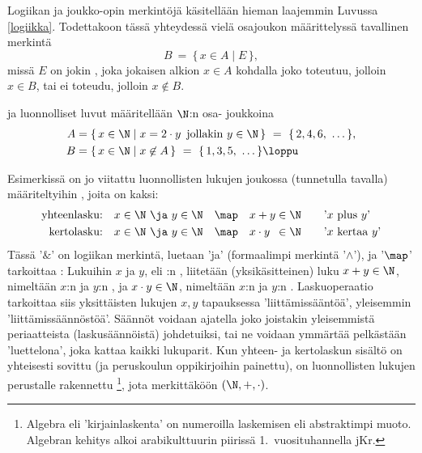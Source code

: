 Logiikan ja joukko-opin merkintöjä käsitellään hieman laajemmin Luvussa \ref{logiikka}. 
Todettakoon tässä yhteydessä vielä osajoukon määrittelyssä tavallinen merkintä
\[ 
B\ =\ \{\,x \in A \mid E\,\}, 
\]
missä $E$ on jokin , joka jokaisen alkion $x \in A$ kohdalla joko toteutuu, jolloin 
$x \in B$, tai ei toteudu, jolloin $x \not\in B$.
\begin{Exa}  ja  luonnolliset luvut määritellään $\N$:n osa-
joukkoina %
\begin{align*}
A &= \{\,x \in \N \mid x=2\cdot y\,\ \text{jollakin}\ y\in\N\,\}\ =\ \{\,2,4,6,\ \ldots\,\}, \\
B &= \{\,x\in\N \mid x\not\in A\,\}\ =\ \{\,1,3,5,\ \ldots\,\} \loppu
\end{align*} 
\end{Exa}
Esimerkissä on jo viitattu luonnollisten lukujen joukossa (tunnetulla tavalla) määriteltyihin 
%
, joita on kaksi:
\begin{align*}
\text{yhteenlasku:} \quad &x \in \N\ \ja\ y \in \N \quad \map \quad 
                             x + y \in \N \quad \quad \text{'$x$ plus $y$'} \\
\text{kertolasku:}  \quad &x \in \N\ \ja\ y \in \N \quad \map \quad 
                             x \cdot y\ \,\in \N \quad \quad \text{'$x$ kertaa $y$'}
\end{align*}
Tässä '$\&$' on logiikan merkintä, luetaan 'ja' (formaalimpi merkintä '$\wedge$'), ja 
'$\map$' tarkoittaa : Lukuihin $x$ ja $y$, eli \N:n , liitetään
(yksikäsitteinen) luku $x + y \in \N$, nimeltään $x$:n ja $y$:n , ja 
$x \cdot y \in \N$, nimeltään $x$:n ja $y$:n . Laskuoperaatio tarkoittaa siis 
yksittäisten lukujen $x,y$ tapauksessa 'liittämissääntöä', yleisemmin 'liittämissäännöstöä'. 
Säännöt voidaan ajatella joko joistakin yleisemmistä periaatteista (laskusäännöistä) 
johdetuiksi, tai ne voidaan ymmärtää pelkästään 'luettelona', joka kattaa kaikki lukuparit. Kun
yhteen- ja kertolaskun sisältö on yhteisesti sovittu (ja peruskoulun oppikirjoihin painettu), on
luonnollisten lukujen perustalle rakennettu
%
\footnote[2]{Algebra eli 
'kirjainlaskenta' on numeroilla laskemisen eli  abstraktimpi muoto. Algebran
kehitys alkoi arabikulttuurin piirissä 1.\ vuosituhannella jKr.}, jota merkittäköön
$(\N,+,\cdot)$.

